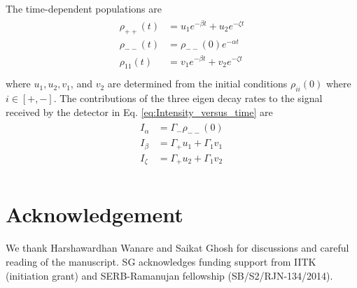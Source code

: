 \documentclass[aps,pra,preprint,groupedaddress]{revtex4-1}
\begin{document}
The time-dependent populations are
\begin{eqnarray}
\begin{aligned}
\label{eq:Populations_versus_time}
\rho_{++}(t) &= u_1e^{-\beta t} + u_2e^{-\zeta t}\\
\rho_{--}(t) &= \rho_{--}(0)e^{-\alpha t}\\
\rho_{11}(t) &= v_1e^{-\beta t} + v_2e^{-\zeta t}\\
\end{aligned}
\end{eqnarray}
where $u_1, u_2, v_1$, and $v_2$ are determined from the initial conditions $\rho_{ii}(0)$ where $i\in[+,-]$. The contributions of the three eigen decay rates to the signal received by the detector in Eq. \ref{eq:Intensity_versus_time} are
\begin{eqnarray}
\begin{aligned}
\label{eq:IntensityCoefficients}
I_{\alpha} &= \Gamma_-\rho_{--}(0)\\
I_{\beta} &= \Gamma_+u_1 + \Gamma_1v_1\\
I_{\zeta} &= \Gamma_+u_2 + \Gamma_1v_2\\
\end{aligned}
\end{eqnarray}

\section*{Acknowledgement}
We thank Harshawardhan Wanare and Saikat Ghosh for discussions and careful reading of the manuscript. SG acknowledges funding support from IITK (initiation grant) and SERB-Ramanujan fellowship (SB/S2/RJN-134/2014).




\end{document}
